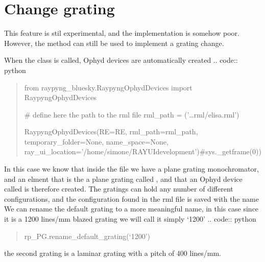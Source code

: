 \documentclass[letterpaper,10pt,english]{sphinxmanual}
\begin{document}
\section{Change grating}
\label{\detokenize{how_to:change-grating}}
\sphinxAtStartPar
This feature is stil experimental, and the implementation is somehow poor. However, the method can still be used to implement a grating change.

\sphinxAtStartPar
When the  class is called, Ophyd devices are automatically created
.. code:: python
\begin{quote}

\sphinxAtStartPar
from raypyng\_bluesky.RaypyngOphydDevices import RaypyngOphydDevices

\sphinxAtStartPar
\# define here the path to the rml file
rml\_path = (’…rml/elisa.rml’)

\sphinxAtStartPar
RaypyngOphydDevices(RE=RE, rml\_path=rml\_path, temporary\_folder=None, name\_space=None, ray\_ui\_location=’/home/simone/RAY\sphinxhyphen{}UI\sphinxhyphen{}development’)\#sys.\_getframe(0))
\end{quote}

\sphinxAtStartPar
In this case we know that inside the  file we have a plane grating monochromator, and an elment that is the a plane grating called ,
and that an Ophyd device called  is therefore created. The gratings can hold any number of different configurations, and the configuration found in the
rml file is saved with the name 
We can rename the default grating to a more meaningful name, in this case since it is a 1200 lines/mm blazed grating we will call it simply ‘1200’
.. code:: python
\begin{quote}

\sphinxAtStartPar
rp\_PG.rename\_default\_grating(‘1200’)
\end{quote}

\sphinxAtStartPar
the second grating is a laminar grating with a pitch of 400 lines/mm.
\end{document}
